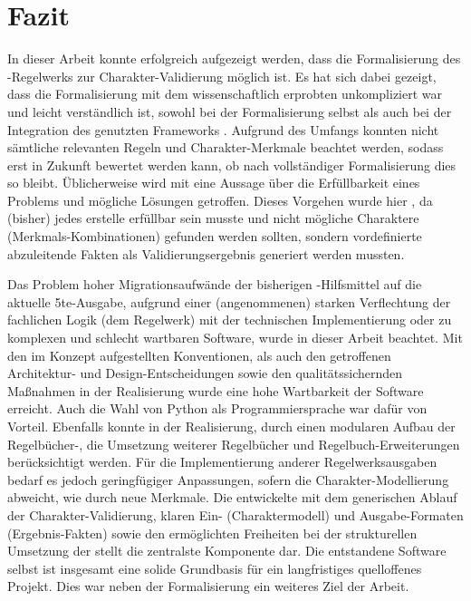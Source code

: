 \chapter{Fazit}\label{ch:fazit}

In dieser Arbeit konnte erfolgreich aufgezeigt werden, dass die Formalisierung des -Regelwerks zur Charakter-Validierung möglich ist.
Es hat sich dabei gezeigt, dass die Formalisierung mit dem wissenschaftlich erprobten  unkompliziert war und leicht verständlich ist, sowohl bei der Formalisierung selbst als auch bei der Integration des genutzten Frameworks .
Aufgrund des Umfangs konnten nicht sämtliche relevanten Regeln und Charakter-Merkmale beachtet werden, sodass erst in Zukunft bewertet werden kann, ob nach vollständiger Formalisierung dies so bleibt.
Üblicherweise wird mit  eine Aussage über die Erfüllbarkeit eines Problems und mögliche Lösungen getroffen.
Dieses Vorgehen wurde hier , da (bisher) jedes erstelle  erfüllbar sein musste und nicht mögliche Charaktere (Merkmals-Kombinationen) gefunden werden sollten, sondern vordefinierte abzuleitende Fakten als Validierungsergebnis generiert werden mussten.

Das Problem hoher Migrationsaufwände der bisherigen -Hilfsmittel auf die aktuelle 5te-Ausgabe, aufgrund einer (angenommenen) starken Verflechtung der fachlichen Logik (dem Regelwerk) mit der technischen Implementierung oder zu komplexen und schlecht wartbaren Software, wurde in dieser Arbeit beachtet.
Mit den im Konzept aufgestellten Konventionen, als auch den getroffenen Architektur- und Design-Entscheidungen sowie den qualitätssichernden Maßnahmen in der Realisierung wurde eine hohe Wartbarkeit der Software erreicht.
Auch die Wahl von Python als Programmiersprache war dafür von Vorteil.
Ebenfalls konnte in der Realisierung, durch einen modularen Aufbau der Regelbücher-, die Umsetzung weiterer Regelbücher und Regelbuch-Erweiterungen berücksichtigt werden.
Für die Implementierung anderer Regelwerksausgaben bedarf es jedoch geringfügiger Anpassungen, sofern die Charakter-Modellierung abweicht, wie \zB durch neue Merkmale.
Die entwickelte  mit dem generischen Ablauf der Charakter-Validierung, klaren Ein- (Charaktermodell) und Ausgabe-Formaten (Ergebnis-Fakten) sowie den ermöglichten Freiheiten bei der strukturellen Umsetzung der  stellt die zentralste Komponente dar.
Die entstandene Software selbst ist insgesamt eine solide Grundbasis für ein langfristiges quelloffenes Projekt.
Dies war neben der Formalisierung ein weiteres Ziel der Arbeit.

